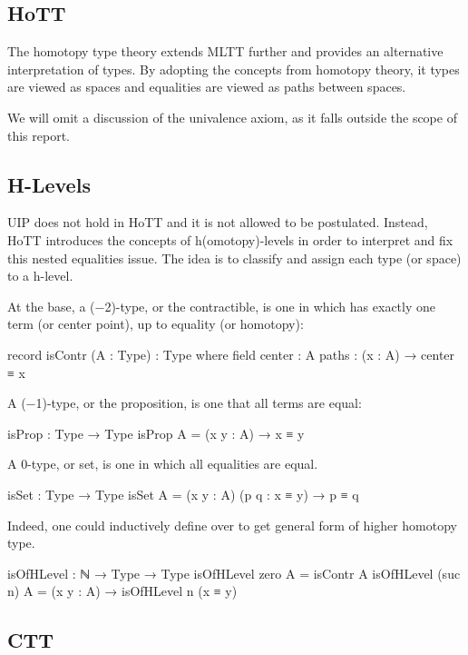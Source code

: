 \subsection*{HoTT}

The homotopy type theory extends MLTT further and provides an alternative interpretation of types. By adopting the concepts from homotopy theory, it types are viewed as spaces and equalities are viewed as paths between spaces.

We will omit a discussion of the univalence axiom, as it falls outside the scope of this report.

\subsection*{H-Levels}

UIP does not hold in HoTT and it is not allowed to be postulated. Instead, HoTT introduces the concepts of h(omotopy)-levels in order to interpret and fix this nested equalities issue. The idea is to classify and assign each type (or space) to a h-level.

At the base, a (−2)-type, or the contractible, is one in which has exactly one term (or center point), up to equality (or homotopy):

\begin{code}
record isContr (A : Type) : Type where
  field
    center : A
    paths : (x : A) → center ≡ x
\end{code}

A (−1)-type, or the proposition, is one that all terms are equal:

\begin{code}
isProp : Type → Type
isProp A = (x y : A) → x ≡ y
\end{code}

A 0-type, or set, is one in which all equalities are equal.

\begin{code}
isSet : Type → Type
isSet A = (x y : A) (p q : x ≡ y) → p ≡ q
\end{code}

Indeed, one could inductively define  over  to get general form of higher homotopy type.

\begin{code}
isOfHLevel : ℕ → Type → Type
isOfHLevel zero A = isContr A
isOfHLevel (suc n) A = (x y : A) → isOfHLevel n (x ≡ y)
\end{code}

\subsection*{CTT}

